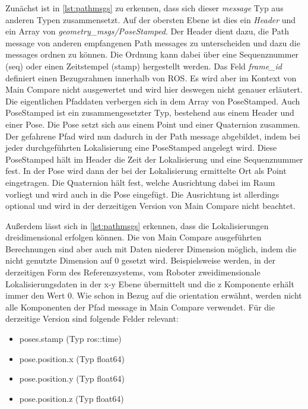 Zunächst ist in \autoref{lst:pathmsgs} zu erkennen, dass sich dieser \textit{message} Typ aus anderen Typen
zusammensetzt. Auf der obersten Ebene ist dies ein
\textit{Header} und ein Array von \textit{geometry\_msgs/PoseStamped}.
Der Header dient dazu, die Path message von anderen empfangenen
Path messages zu unterscheiden und dazu die messages ordnen zu können. Die Ordnung kann dabei über eine Sequenznummer
(seq) oder einen Zeitstempel (stamp) hergestellt werden. Das Feld
\textit{frame\_id}
definiert einen Bezugsrahmen innerhalb von ROS. Es wird aber im Kontext von
Main Compare nicht ausgewertet und wird hier deswegen nicht genauer erläutert.
Die eigentlichen Pfaddaten verbergen sich in dem Array von PoseStamped. Auch
PoseStamped ist ein zusammengesetzter Typ, bestehend aus einem Header und einer
Pose. Die Pose setzt sich aus einem Point und einer Quaternion zusammen.
Der gefahrene Pfad wird nun dadurch in der Path message abgebildet, indem bei
jeder durchgeführten Lokalisierung eine PoseStamped angelegt wird. Diese PoseStamped
hält im Header die Zeit der Lokalisierung und eine Sequenznummer fest. In der
Pose wird dann der bei der Lokalisierung ermittelte Ort als Point eingetragen. Die Quaternion
hält fest, welche Ausrichtung dabei im Raum vorliegt und wird auch
in die Pose eingefügt. Die Ausrichtung ist
allerdings optional und wird in der derzeitigen Version von Main Compare nicht beachtet. 

Außerdem lässt sich in \autoref{lst:pathmsgs} erkennen, dass die
Lokalisierungen dreidimensional erfolgen können. Die von Main Compare
ausgeführten Berechnungen sind aber auch mit Daten niederer Dimension möglich,
indem die nicht genutzte Dimension auf 0 gesetzt wird. Beispielsweise werden,
in der derzeitigen Form des Referenzsystems, vom Roboter zweidimensionale
Lokalisierungsdaten in der x-y Ebene übermittelt und die z Komponente erhält
immer den Wert 0. Wie schon in Bezug auf die orientation erwähnt, werden nicht alle Komponenten der
Pfad message in Main Compare verwendet. Für die derzeitige Version sind
folgende Felder relevant:

\begin{itemize}
  \item poses.stamp (Typ ros::time)
  \item pose.position.x (Typ float64)
  \item pose.position.y (Typ float64)
  \item pose.position.z (Typ float64)
\end{itemize}


